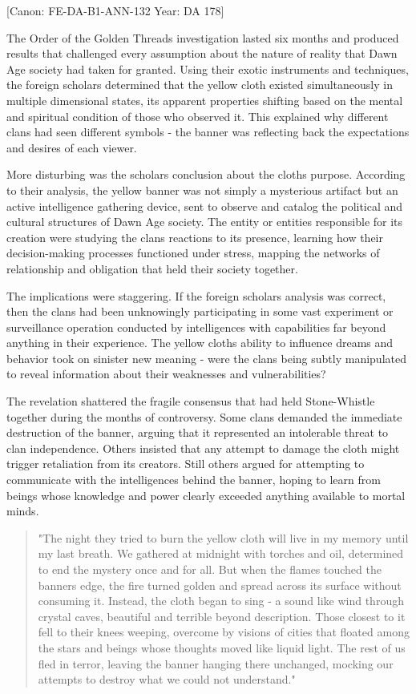 {[}Canon: FE-DA-B1-ANN-132 \textbar{} Year: DA 178{]}

The Order of the Golden Thread\textquotesingle s investigation lasted
six months and produced results that challenged every assumption about
the nature of reality that Dawn Age society had taken for granted. Using
their exotic instruments and techniques, the foreign scholars determined
that the yellow cloth existed simultaneously in multiple dimensional
states, its apparent properties shifting based on the mental and
spiritual condition of those who observed it. This explained why
different clans had seen different symbols - the banner was reflecting
back the expectations and desires of each viewer.

More disturbing was the scholars\textquotesingle{} conclusion about the
cloth\textquotesingle s purpose. According to their analysis, the yellow
banner was not simply a mysterious artifact but an active intelligence
gathering device, sent to observe and catalog the political and cultural
structures of Dawn Age society. The entity or entities responsible for
its creation were studying the clans\textquotesingle{} reactions to its
presence, learning how their decision-making processes functioned under
stress, mapping the networks of relationship and obligation that held
their society together.

The implications were staggering. If the foreign
scholars\textquotesingle{} analysis was correct, then the clans had been
unknowingly participating in some vast experiment or surveillance
operation conducted by intelligences with capabilities far beyond
anything in their experience. The yellow cloth\textquotesingle s ability
to influence dreams and behavior took on sinister new meaning - were the
clans being subtly manipulated to reveal information about their
weaknesses and vulnerabilities?

The revelation shattered the fragile consensus that had held
Stone-Whistle together during the months of controversy. Some clans
demanded the immediate destruction of the banner, arguing that it
represented an intolerable threat to clan independence. Others insisted
that any attempt to damage the cloth might trigger retaliation from its
creators. Still others argued for attempting to communicate with the
intelligences behind the banner, hoping to learn from beings whose
knowledge and power clearly exceeded anything available to mortal minds.

\begin{quote}
"The night they tried to burn the yellow cloth will live in my memory
until my last breath. We gathered at midnight with torches and oil,
determined to end the mystery once and for all. But when the flames
touched the banner\textquotesingle s edge, the fire turned golden and
spread across its surface without consuming it. Instead, the cloth began
to sing - a sound like wind through crystal caves, beautiful and
terrible beyond description. Those closest to it fell to their knees
weeping, overcome by visions of cities that floated among the stars and
beings whose thoughts moved like liquid light. The rest of us fled in
terror, leaving the banner hanging there unchanged, mocking our attempts
to destroy what we could not understand."
\end{quote}

